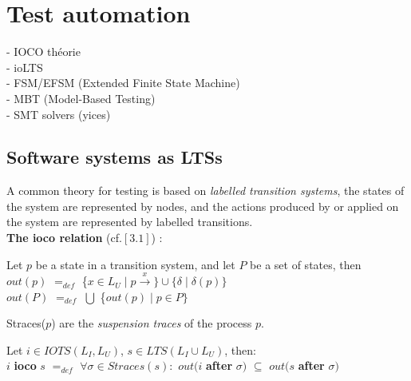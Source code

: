 \documentclass[a4paper]{report}
\begin{document}
\section*{Test automation}
- IOCO théorie\\
- ioLTS\\
- FSM/EFSM (Extended Finite State Machine)\\
- MBT (Model-Based Testing)\\
- SMT solvers (yices)\\

\subsection*{Software systems as LTSs}
A common theory for testing is based on \textit{labelled transition systems}, the states of the system are represented by nodes, and the actions produced by or applied on the system are represented by labelled transitions.\\
\newline
\textbf{The ioco relation} (cf.$[3.1]$) :\\
\newline

\begin{definition}
Let $p$ be a state in a transition system, and let $P$ be a set of states, then\\
\newline
$out(p)$ $=_{def}$ \{$x\in L_U \mid p \xrightarrow{x} \} \cup \{ \delta \mid \delta (p) \}$\\
\newline
$out(P)$ $=_{def}$ $ \bigcup$ \{$out(p) \mid p \in P \}$\\
\end{definition}

\begin{definition}
Straces($p$) are the \textit{suspension traces} of the process $p$.\\
\end{definition}

Let $i \in IOTS(L_I, L_U)$, $s \in LTS(L_I \cup L_U)$, then:\\
$i$ \textbf{ioco} $s$ $=_{def}$ $ \forall \sigma \in Straces(s): $ $out(i$ \textbf{after} $\sigma) $ $\subseteq$ $out(s$ \textbf{after} $\sigma) $\\
\end{document}

